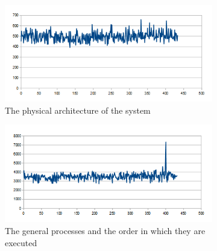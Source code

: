 \begin{figure}[htbp]
	\centering
	\begin{subfigure}[t]{1\textwidth}
		\centering
    		\includegraphics[scale=0.75]{content/images/Experiment/DayRounds}
   	 	\caption{The physical architecture of the system}
    	\label{fig:architecture}
    \end{subfigure}
 
    \begin{subfigure}[t]{1\textwidth}
		\centering         
        \includegraphics[scale=0.75]{content/images/Experiment/DayCollection}
        \caption{The general processes and the order in which they are executed}
        \label{fig:processes}
    \end{subfigure}
    \caption{}
\end{figure}